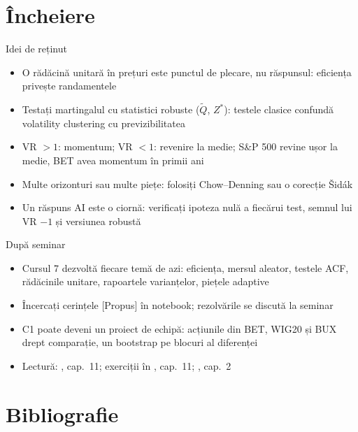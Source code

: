 \section{Încheiere}

\begin{frame}{Idei de reținut}
\itemsize{\small}
\begin{itemize}
    \item O rădăcină unitară în prețuri este punctul de plecare, nu răspunsul: eficiența privește randamentele
    \item Testați martingalul cu statistici robuste ($\tilde Q$, $Z^*$): testele clasice confundă volatility clustering cu previzibilitatea
    \item VR $> 1$: momentum; VR $< 1$: revenire la medie; S\&P 500 revine ușor la medie, BET avea momentum în primii ani
    \item Multe orizonturi sau multe piețe: folosiți Chow--Denning sau o corecție Šidák
    \item Un răspuns AI este o ciornă: verificați ipoteza nulă a fiecărui test, semnul lui VR $- 1$ și versiunea robustă
\end{itemize}
\end{frame}

\begin{frame}{După seminar}
\itemsize{\small}
\begin{itemize}
    \item Cursul 7 dezvoltă fiecare temă de azi: eficiența, mersul aleator, testele ACF, rădăcinile unitare, rapoartele varianțelor, piețele adaptive
    \item Încercați cerințele [Propus] în notebook; rezolvările se discută la seminar
    \item C1 poate deveni un proiect de echipă: acțiunile din BET, WIG20 și BUX drept comparație, un bootstrap pe blocuri al diferenței
    \item Lectură: , cap.~11; exerciții în , cap.~11; , cap.~2
\end{itemize}
\end{frame}


\section{Bibliografie}

